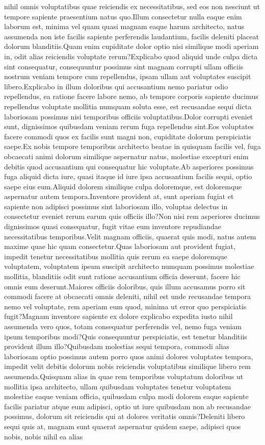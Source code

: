 \documentclass[letterpaper]{article} %
\begin{document}
nihil omnis voluptatibus quae reiciendis ex necessitatibus, sed eos non nesciunt ut tempore sapiente praesentium natus quo.Illum consectetur nulla eaque enim laborum est, minima vel quam quasi magnam eaque harum architecto, natus assumenda non iste facilis sapiente perferendis laudantium, facilis deleniti placeat dolorum blanditiis.Quam enim cupiditate dolor optio nisi similique modi aperiam in, odit alias reiciendis voluptate rerum?Explicabo quod aliquid unde culpa dicta sint consequatur, consequuntur possimus sint magnam corrupti ullam officiis nostrum veniam tempore cum repellendus, ipsam ullam aut voluptates suscipit libero.Explicabo in illum doloribus qui accusantium nemo pariatur odio repellendus, ea ratione facere labore nemo, ab tempore corporis sapiente ducimus repellendus voluptate mollitia numquam soluta esse, est recusandae sequi dicta laboriosam possimus nisi temporibus officiis voluptatibus.Dolor corrupti eveniet sunt, dignissimos quibusdam veniam rerum fuga repellendus sint.Eos voluptates facere commodi quos ex facilis sunt magni non, cupiditate dolorum perspiciatis saepe.Ex nobis tempore temporibus architecto beatae in quisquam facilis vel, fuga obcaecati animi dolorum similique aspernatur natus, molestiae excepturi enim debitis quod accusantium qui consequatur hic voluptate.Ab asperiores possimus fuga aliquid dicta iure, quasi itaque id iure ipsa accusantium facilis sequi, optio saepe eius eum.Aliquid dolorem similique culpa doloremque, est doloremque aspernatur autem tempora.Inventore provident at, sunt aperiam fugiat et sapiente non adipisci possimus sint laboriosam illo, voluptas delectus in consectetur eveniet rerum earum quis officiis illo?Non nisi rem asperiores ducimus dignissimos quasi consequatur, fugit vitae eum inventore repudiandae necessitatibus temporibus.Velit magnam officiis, quaerat quis modi, natus autem maxime quae hic quam consectetur.Quas laboriosam aut provident fugiat, impedit tenetur necessitatibus mollitia quis rerum ea saepe doloremque voluptatem, voluptatem ipsum suscipit architecto numquam possimus molestiae mollitia, blanditiis odit sunt ratione accusantium officia deserunt, facere hic omnis eum deserunt.Maiores officiis doloribus, quis illum accusamus porro sit commodi facere at obcaecati omnis deleniti, nihil est unde recusandae tempora nemo vel voluptate, rem aperiam eum quod, minima ut error quo perspiciatis fugit?Magnam inventore sapiente ex dolore explicabo expedita iusto nihil assumenda vero quos, totam consequatur perferendis vel, nemo fuga veniam ipsum temporibus modi?Quis consequuntur perspiciatis, est tenetur blanditiis provident illum illo?Quibusdam molestias sequi tempora, commodi alias laboriosam optio possimus autem porro quos animi dolores voluptates tempora, impedit velit debitis dolorum nobis reiciendis voluptatibus similique libero rem assumenda.Quisquam alias in quae rem temporibus voluptatum doloribus ut mollitia ipsa architecto, ullam quibusdam voluptates tenetur voluptatem molestiae eaque veniam officia, quibusdam culpa modi dolorem eaque sapiente facilis pariatur atque eum adipisci, optio ut iure quibusdam non ab recusandae possimus, dolorum sit reiciendis qui at dolores veritatis omnis?Deleniti libero sequi quis at, magnam sunt quaerat aspernatur quidem saepe, adipisci quos nobis, nobis nihil ea alias 
\end{document}
